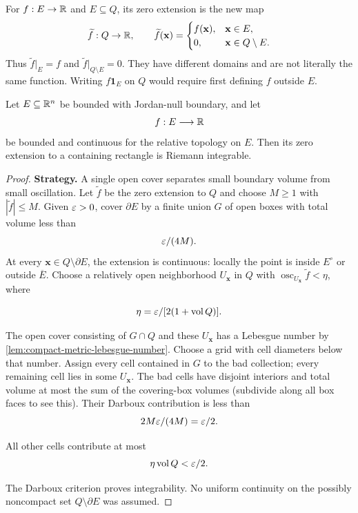 For $f:E\to\mathbb{R}$ and $E\subseteq Q$, its zero extension is the new map
\[
\widetilde f:Q\to\mathbb{R},\qquad
\widetilde f(\mathbf{x})=\begin{cases}f(\mathbf{x}),&\mathbf{x}\in E,\\0,&\mathbf{x}\in Q\setminus E.\end{cases}
\]
Thus $\widetilde f|_E=f$ and $\widetilde f|_{Q\setminus E}=0$.
They have different domains and are not literally the same function.
Writing $f\mathbf1_E$ on $Q$ would require first defining $f$ outside $E$.

\begin{proposition}
\label{prop:continuous-jordan-extension}
Let \(E\subseteq\mathbb{R}^n\) be bounded with Jordan-null boundary, and let
\[
f:E\longrightarrow\mathbb{R}
\]
be bounded and continuous for the relative topology on \(E\).  Then its zero
extension to a containing rectangle is Riemann integrable.
\end{proposition}
\begin{proof}
\textbf{Strategy.} A single open cover separates small boundary volume
from small oscillation. Let $\widetilde f$ be the zero extension to $Q$
and choose $M\geq1$ with $|\widetilde f|\leq M$.
Given $\varepsilon>0$, cover $\partial E$ by a finite union $G$ of open boxes
with total volume less than
\[
\varepsilon/(4M).
\]
 At every
$\mathbf{x}\in Q\setminus\partial E$, the extension is continuous: locally the
point is inside $E^\circ$ or outside $\overline E$.
Choose a relatively open neighborhood $U_{\mathbf{x}}$ in $Q$ with
$\operatorname{osc}_{U_{\mathbf{x}}}\widetilde f<\eta$, where

\[
\eta=\varepsilon/[2(1+\operatorname{vol}Q)].
\]

The open cover consisting of $G\cap Q$ and these $U_{\mathbf{x}}$ has a Lebesgue
number by \cref{lem:compact-metric-lebesgue-number}. Choose a grid with
cell diameters below that number. Assign every cell contained in $G$ to
the bad collection; every remaining cell lies in some $U_{\mathbf{x}}$.
The bad cells have disjoint interiors and total volume at most the sum
of the covering-box volumes (subdivide along all box faces to see this).
Their Darboux contribution is less than
\[
2M\varepsilon/(4M)=\varepsilon/2.
\]

All other cells contribute at most
\[
\eta\operatorname{vol}Q<\varepsilon/2.
\]

The Darboux criterion proves integrability. No uniform continuity on
the possibly noncompact set $Q\setminus\partial E$ was assumed.
\end{proof}

